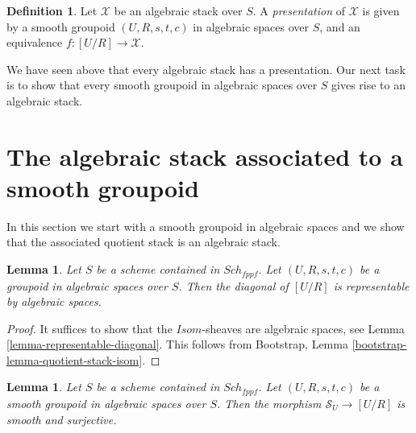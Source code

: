 \documentclass{stacks-project}
\theoremstyle{plain}
\newtheorem{lemma}[subsection]{Lemma}
\theoremstyle{definition}
\newtheorem{definition}[subsection]{Definition}
\theoremstyle{remark}
\numberwithin{equation}{subsection}
\def\Sch{\mathit{Sch}}
\begin{document}
\begin{definition}
\label{definition-presentation}
Let $\mathcal{X}$ be an algebraic stack over $S$.
A {\it presentation} of $\mathcal{X}$ is given by a smooth groupoid
$(U, R, s, t, c)$ in algebraic spaces over $S$, and an
equivalence $f : [U/R] \to \mathcal{X}$.
\end{definition}

\noindent
We have seen above that every algebraic stack has a presentation.
Our next task is to show that every smooth groupoid in algebraic
spaces over $S$ gives rise to an algebraic stack.


\section{The algebraic stack associated to a smooth groupoid}
\label{section-smooth-groupoid-gives-algebraic-stack}

\noindent
In this section we start with a smooth groupoid in algebraic spaces
and we show that the associated quotient stack is an algebraic stack.

\begin{lemma}
\label{lemma-diagonal-quotient-stack}
Let $S$ be a scheme contained in $\Sch_{fppf}$.
Let $(U, R, s, t, c)$ be a groupoid in algebraic spaces over $S$.
Then the diagonal of $[U/R]$ is representable by algebraic spaces.
\end{lemma}

\begin{proof}
It suffices to show that the $\mathit{Isom}$-sheaves are algebraic
spaces, see
Lemma \ref{lemma-representable-diagonal}.
This follows from
Bootstrap, Lemma \ref{bootstrap-lemma-quotient-stack-isom}.
\end{proof}

\begin{lemma}
\label{lemma-smooth-quotient-smooth-presentation}
Let $S$ be a scheme contained in $\Sch_{fppf}$.
Let $(U, R, s, t, c)$ be a smooth groupoid in algebraic spaces over $S$.
Then the morphism $\mathcal{S}_U \to [U/R]$ is smooth and surjective.
\end{lemma}
\end{document}
